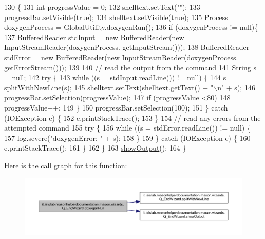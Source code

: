\begin{DoxyCode}
130                               \{
131         \textcolor{keywordtype}{int} progressValue = 0;
132         shelltext.setText(\textcolor{stringliteral}{""});
133         progressBar.setVisible(\textcolor{keyword}{true});
134         shelltext.setVisible(\textcolor{keyword}{true});
135         Process doxygenProcess = GlobalUtility.doxygenRun();
136         \textcolor{keywordflow}{if} (doxygenProcess != null)\{
137             BufferedReader stdInput = \textcolor{keyword}{new} BufferedReader(\textcolor{keyword}{new} InputStreamReader(doxygenProcess.
      getInputStream()));
138             BufferedReader stdError = \textcolor{keyword}{new} BufferedReader(\textcolor{keyword}{new} InputStreamReader(doxygenProcess.
      getErrorStream()));
139 
140             \textcolor{comment}{// read the output from the command}
141             String s = null;
142             \textcolor{keywordflow}{try} \{
143                 \textcolor{keywordflow}{while} ((s = stdInput.readLine()) != null) \{
144                     s = \hyperlink{classit_1_1isislab_1_1masonhelperdocumentation_1_1mason_1_1wizards_1_1_q___end_wizard_a1cdec1efdad895973386d4679b790a1c}{splitWithNewLine}(s);
145                     shelltext.setText(shelltext.getText() + \textcolor{stringliteral}{"\(\backslash\)n"} + s);
146                     progressBar.setSelection(progressValue);
147                     \textcolor{keywordflow}{if} (progressValue <80)
148                         progressValue++;
149                 \}
150                 progressBar.setSelection(100);
151             \} \textcolor{keywordflow}{catch} (IOException e) \{
152                 e.printStackTrace();
153             \}
154             \textcolor{comment}{// read any errors from the attempted command}
155             \textcolor{keywordflow}{try} \{
156                 \textcolor{keywordflow}{while} ((s = stdError.readLine()) != null) \{                 
157                     log.severe(\textcolor{stringliteral}{"doxygenError: "} + s);
158                 \}
159             \} \textcolor{keywordflow}{catch} (IOException e) \{
160                 e.printStackTrace();
161             \}
162         \}
163         \hyperlink{classit_1_1isislab_1_1masonhelperdocumentation_1_1mason_1_1wizards_1_1_q___end_wizard_a944a5732f2c5ba72de80c4bd014c3afb}{showOutput}();
164     \}
\end{DoxyCode}


Here is the call graph for this function\-:\nopagebreak
\begin{figure}[H]
\begin{center}
\leavevmode
\includegraphics[width=350pt]{classit_1_1isislab_1_1masonhelperdocumentation_1_1mason_1_1wizards_1_1_q___end_wizard_a5711bf4858bd7e5787743ec96669a19d_cgraph}
\end{center}
\end{figure}




